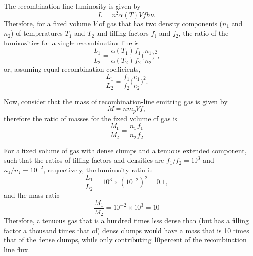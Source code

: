 \documentclass[12pt, twoside]{report}
\begin{document}
\noindent
The recombination line luminosity is given by
\begin{equation}
    L=n^2\alpha(T)Vfh\nu.
    \label{eq: l}
\end{equation}
Therefore, for a fixed volume $V$ of gas that has two density components ($n_1$ and $n_2$) of temperatures $T_1$ and $T_2$ and filling factors $f_1$ and $f_2$, the ratio of the luminosities for a single recombination line is
\begin{equation}
    \frac{L_1}{L_2}=\frac{\alpha(T_1)}{\alpha(T_2)}\frac{f_1}{f_2}\Bigg(\frac{n_1}{n_2}\Bigg)^2,
    \label{eq: l_ratio}
\end{equation}
or, assuming equal recombination coefficients,
\begin{equation}
    \frac{L_1}{L_2}=\frac{f_1}{f_2}\Bigg(\frac{n_1}{n_2}\Bigg)^2.
    \label{eq: l_ratio_equal_alpha}
\end{equation}

Now, consider that the mass of recombination-line emitting gas is given by
\begin{equation}
    M = nm_pVf,
    \label{eq: m}
\end{equation}
therefore the ratio of masses for the fixed volume of gas is
\begin{equation}
    \frac{M_1}{M_2}=\frac{n_1}{n_2}\frac{f_1}{f_2}
\end{equation}

For a fixed volume of gas with dense clumps and a tenuous extended component, such that the ratios of filling factors and densities are $f_1/f_2=10^3$ and $n_1/n_2=10^{-2}$, respectively, the luminosity ratio is
\begin{equation}
    \frac{L_1}{L_2}=10^3\times(10^{-2})^2=0.1,
\end{equation}
and the mass ratio
\begin{equation}
    \frac{M_1}{M_2}=10^{-2}\times10^3=10
\end{equation}
Therefore, a tenuous gas that is a hundred times less dense than (but has a filling factor a thousand times that of) dense clumps would have a mass that is 10 times that of the dense clumps, while only contributing 10\;per\;cent of the recombination line flux.
\end{document}
